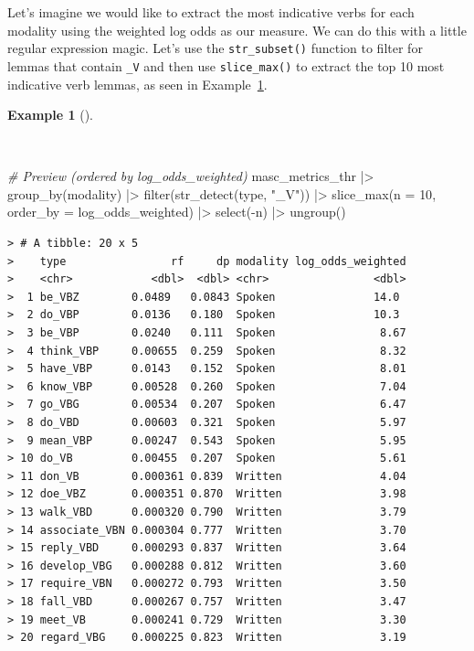 \documentclass[
  letterpaper,
  DIV=11,
  numbers=noendperiod]{scrreprt}
\newenvironment{Shaded}{\begin{snugshade}}{\end{snugshade}}
\newcommand{\AttributeTok}[1]{\textcolor[rgb]{0.00,0.00,0.00}{#1}}
\newcommand{\CommentTok}[1]{\textcolor[rgb]{0.00,0.00,0.00}{\textit{#1}}}
\newcommand{\DecValTok}[1]{\textcolor[rgb]{0.00,0.00,0.00}{#1}}
\newcommand{\FunctionTok}[1]{\textcolor[rgb]{0.00,0.00,0.00}{#1}}
\newcommand{\NormalTok}[1]{\textcolor[rgb]{0.00,0.00,0.00}{#1}}
\newcommand{\SpecialCharTok}[1]{\textcolor[rgb]{0.00,0.00,0.00}{#1}}
\newcommand{\StringTok}[1]{\textcolor[rgb]{0.00,0.00,0.00}{#1}}
\theoremstyle{definition}
\newtheorem{example}{Example}[chapter]
\theoremstyle{remark}
\begin{document}
Let's imagine we would like to extract the most indicative verbs for
each modality using the weighted log odds as our measure. We can do this
with a little regular expression magic. Let's use the
\texttt{str\_subset()} function to filter for lemmas that contain
\texttt{\_V} and then use \texttt{slice\_max()} to extract the top 10
most indicative verb lemmas, as seen in
Example~\ref{exm-eda-masc-log-odds-weighted-verbs}.

\begin{example}[]\protect\hypertarget{exm-eda-masc-log-odds-weighted-verbs}{}\label{exm-eda-masc-log-odds-weighted-verbs}

~

\begin{Shaded}
\begin{Highlighting}[]
\CommentTok{\# Preview (ordered by log\_odds\_weighted)}
\NormalTok{masc\_metrics\_thr }\SpecialCharTok{|\textgreater{}}
  \FunctionTok{group\_by}\NormalTok{(modality) }\SpecialCharTok{|\textgreater{}}
  \FunctionTok{filter}\NormalTok{(}\FunctionTok{str\_detect}\NormalTok{(type, }\StringTok{"\_V"}\NormalTok{)) }\SpecialCharTok{|\textgreater{}}
  \FunctionTok{slice\_max}\NormalTok{(}\AttributeTok{n =} \DecValTok{10}\NormalTok{, }\AttributeTok{order\_by =}\NormalTok{ log\_odds\_weighted) }\SpecialCharTok{|\textgreater{}}
  \FunctionTok{select}\NormalTok{(}\SpecialCharTok{{-}}\NormalTok{n) }\SpecialCharTok{|\textgreater{}}
  \FunctionTok{ungroup}\NormalTok{()}
\end{Highlighting}
\end{Shaded}

\begin{verbatim}
> # A tibble: 20 x 5
>    type                rf     dp modality log_odds_weighted
>    <chr>            <dbl>  <dbl> <chr>                <dbl>
>  1 be_VBZ        0.0489   0.0843 Spoken               14.0 
>  2 do_VBP        0.0136   0.180  Spoken               10.3 
>  3 be_VBP        0.0240   0.111  Spoken                8.67
>  4 think_VBP     0.00655  0.259  Spoken                8.32
>  5 have_VBP      0.0143   0.152  Spoken                8.01
>  6 know_VBP      0.00528  0.260  Spoken                7.04
>  7 go_VBG        0.00534  0.207  Spoken                6.47
>  8 do_VBD        0.00603  0.321  Spoken                5.97
>  9 mean_VBP      0.00247  0.543  Spoken                5.95
> 10 do_VB         0.00455  0.207  Spoken                5.61
> 11 don_VB        0.000361 0.839  Written               4.04
> 12 doe_VBZ       0.000351 0.870  Written               3.98
> 13 walk_VBD      0.000320 0.790  Written               3.79
> 14 associate_VBN 0.000304 0.777  Written               3.70
> 15 reply_VBD     0.000293 0.837  Written               3.64
> 16 develop_VBG   0.000288 0.812  Written               3.60
> 17 require_VBN   0.000272 0.793  Written               3.50
> 18 fall_VBD      0.000267 0.757  Written               3.47
> 19 meet_VB       0.000241 0.729  Written               3.30
> 20 regard_VBG    0.000225 0.823  Written               3.19
\end{verbatim}

\end{example}
\end{document}
